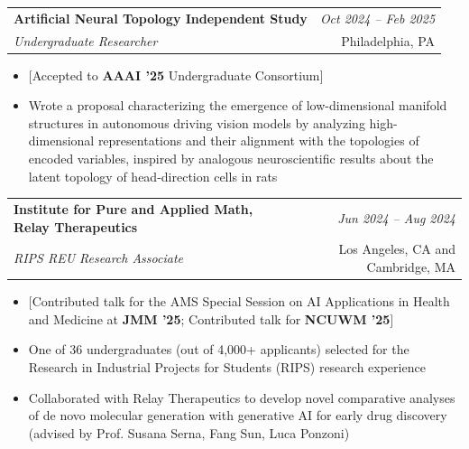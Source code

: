 \documentclass[a4paper,11pt]{article}
\makeatletter
\newcommand{\resumeSubheading}[4]{
\vspace{0.5mm}\item
    \begin{tabular*}{0.98\textwidth}[t]{l@{\extracolsep{\fill}}r}
        \textbf{#1} & \textit{\footnotesize{#4}} \\
        \textit{\footnotesize{#3}} &  \footnotesize{#2}\\
    \end{tabular*}
    \vspace{-2.4mm}
}
\newcommand{\resumeItemListStart}{\begin{itemize}[leftmargin=*,labelsep=1mm,itemsep=0.5mm]}
\newcommand{\resumeItemListEnd}{\end{itemize}\vspace{-2mm}}
\makeatother
\begin{document}
\resumeSubheading
      {Artificial Neural Topology Independent Study}{Philadelphia, PA}
      {Undergraduate Researcher}{Oct 2024 – Feb 2025}
      \resumeItemListStart
        \item $[$Accepted to \textbf{AAAI '25} Undergraduate Consortium$]$
        \item Wrote a proposal characterizing the emergence of low-dimensional manifold structures in autonomous driving vision models by analyzing high-dimensional representations and their alignment with the topologies of encoded variables, inspired by analogous neuroscientific results about the latent topology of head-direction cells in rats
      \resumeItemListEnd 
      
\resumeSubheading
    {Institute for Pure and Applied Math, Relay Therapeutics}{Los Angeles, CA and Cambridge, MA}
    {RIPS REU Research Associate}{Jun 2024 – Aug 2024}
    \resumeItemListStart
      \item $[$Contributed talk for the AMS Special Session on AI Applications in Health and Medicine at \textbf{JMM '25}; Contributed talk for \textbf{NCUWM '25}$]$
      \item One of 36 undergraduates (out of 4,000+ applicants) selected for the Research in Industrial Projects for Students (RIPS) research experience
      \item Collaborated with Relay Therapeutics to develop novel comparative analyses of de novo molecular generation with generative AI for early drug discovery (advised by Prof. Susana Serna, Fang Sun, Luca Ponzoni)
    \resumeItemListEnd
\end{document}
